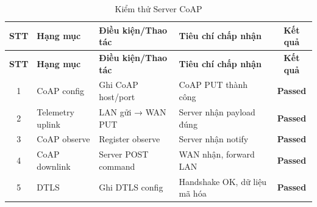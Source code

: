         \begin{longtable}{|c|p{3cm}|p{4cm}|p{5cm}|c|}
            \caption{Kiểm thử Server CoAP}
            \label{tab:test_coap} \\
            \hline
            \textbf{STT} & \textbf{Hạng mục} & \textbf{Điều kiện/Thao tác} & \textbf{Tiêu chí chấp nhận} & \textbf{Kết quả} \\ \hline
            \endfirsthead
        
            \hline
            \textbf{STT} & \textbf{Hạng mục} & \textbf{Điều kiện/Thao tác} & \textbf{Tiêu chí chấp nhận} & \textbf{Kết quả} \\ \hline
            \endhead
        
            \hline
            \endfoot
            \endlastfoot
        
            1 & CoAP config & Ghi CoAP host/port & CoAP PUT thành công & \textcolor{modern_blue}{\textbf{Passed}} \\ \hline
            2 & Telemetry uplink & LAN gửi → WAN PUT & Server nhận payload đúng & \textcolor{modern_blue}{\textbf{Passed}} \\ \hline
            3 & CoAP observe & Register observe & Server nhận notify & \textcolor{modern_blue}{\textbf{Passed}} \\ \hline
            4 & CoAP downlink & Server POST command & WAN nhận, forward LAN & \textcolor{modern_blue}{\textbf{Passed}} \\ \hline
            5 & DTLS & Ghi DTLS config & Handshake OK, dữ liệu mã hóa & \textcolor{modern_blue}{\textbf{Passed}} \\ \hline
        \end{longtable}

